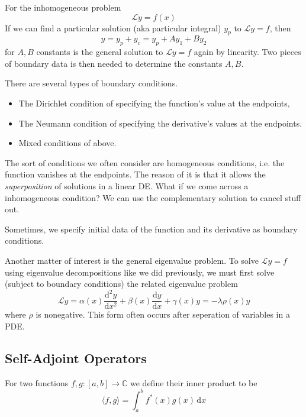 \documentclass[a4paper]{article}
\begin{document}
For the inhomogeneous problem 
\begin{equation}
    \mathcal Ly=f(x)
\end{equation}
If we can find a particular solution (aka particular integral) $y_p$ to $\mathcal Ly=f$, then
\begin{equation}
    y=y_p+y_c=y_p+Ay_1+By_2
\end{equation}
for $A,B$ constants is the general solution to $\mathcal Ly=f$ again by linearity.
Two pieces of boundary data is then needed to determine the constants $A,B$.

There are several types of boundary conditions.
\begin{itemize}
    \item The Dirichlet condition of specifying the function's value at the endpoints, \item The Neumann condition of specifying the derivative's values at the endpoints.
    \item Mixed conditions of above.
\end{itemize}

The sort of conditions we often consider are homogeneous conditions, i.e. the function vanishes at the endpoints.
The reason of it is that it allows the \textit{superposition} of solutions in a linear DE.
What if we come across a inhomogeneous condition?
We can use the complementary solution to cancel stuff out.

Sometimes, we specify initial data of the function and its derivative as boundary conditions.

Another matter of interest is the general eigenvalue problem.
To solve $\mathcal Ly=f$ using eigenvalue decompositions like we did previously, we must first solve (subject to boundary conditions) the related eigenvalue problem
\begin{equation}
    \mathcal Ly=\alpha(x)\frac{\mathrm d^2y}{\mathrm dx^2}+\beta(x)\frac{\mathrm dy}{\mathrm dx}+\gamma(x)y=-\lambda\rho(x)y
\end{equation}
where $\rho$ is nonegative.
This form often occurs after seperation of variables in a PDE.
\subsection{Self-Adjoint Operators}
\begin{definition}
    For two functions $f,g:[a,b]\to\mathbb C$ we define their inner product to be
    $$\langle f,g\rangle=\int_a^bf^*(x)g(x)\,\mathrm dx$$
\end{definition}
\end{document}
